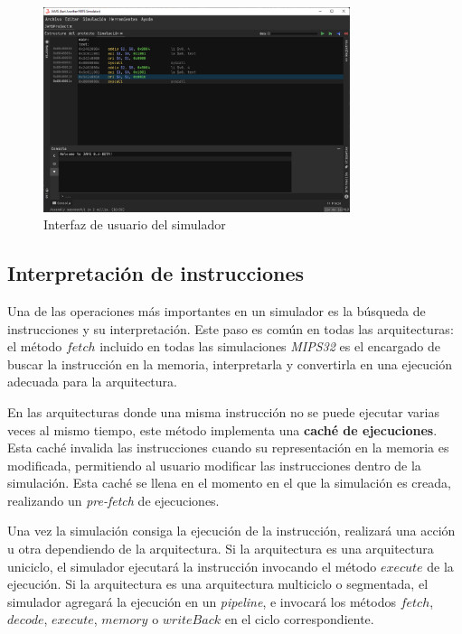 \begin{figure}[H]
    \centering
    \includegraphics[width=0.8\textwidth]{images/mips/jams-simulation}
    \caption{Interfaz de usuario del simulador}
    \label{fig:jams-simulation}
\end{figure}

\subsection{Interpretación de instrucciones}\label{subsec:interpretación-de-instrucciones}

Una de las operaciones más importantes en un simulador es la búsqueda
de instrucciones y su interpretación.
Este paso es común en todas las arquitecturas: el método $fetch$
incluido en todas las simulaciones \textit{MIPS32} es el encargado
de buscar la instrucción en la memoria, interpretarla y convertirla
en una ejecución adecuada para la arquitectura.

\noindent En las arquitecturas donde una misma instrucción no se puede
ejecutar varias veces al mismo tiempo, este método implementa una
\textbf{caché de ejecuciones}.
Esta caché invalida las instrucciones cuando su representación en
la memoria es modificada, permitiendo al usuario modificar las
instrucciones dentro de la simulación.
Esta caché se llena en el momento en el que la simulación es creada,
realizando un \textit{pre-fetch} de ejecuciones.

\noindent Una vez la simulación consiga la ejecución de la instrucción,
realizará una acción u otra dependiendo de la arquitectura.
Si la arquitectura es una arquitectura uniciclo, el simulador ejecutará
la instrucción invocando el método $execute$ de la ejecución.
Si la arquitectura es una arquitectura multiciclo o segmentada, el simulador
agregará la ejecución en un \textit{pipeline}, e invocará
los métodos $fetch$, $decode$, $execute$, $memory$
o $writeBack$ en el ciclo correspondiente.

